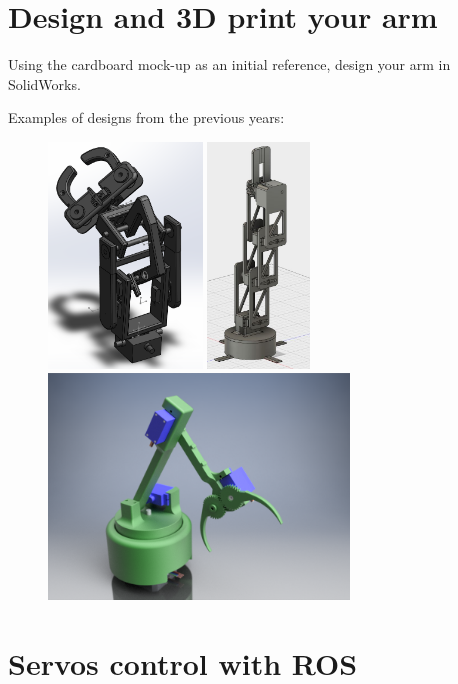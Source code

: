 \documentclass{instructions}
\begin{document}
\part{Design and 3D print your arm}

Using the cardboard mock-up as an initial reference, design your arm in
SolidWorks.

Examples of designs from the previous years:

\begin{figure}[h!]
    \centering
    \includegraphics[height=6cm]{design3}
    \includegraphics[height=6cm]{design1}
    \includegraphics[height=6cm]{design2}
\end{figure}




\part{Servos control with ROS}
\end{document}
